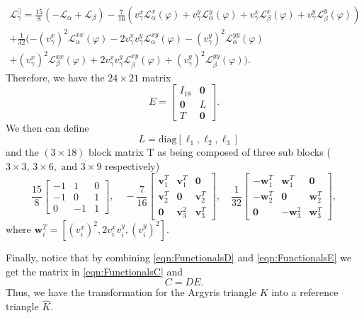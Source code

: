 \begin{equation*}
  \begin{split}
    \mathcal{L}^{||}_{\gamma} = \frac{15}{8}(-\mathcal{L}_{\alpha} +
      \mathcal{L}_{\beta})
    - \frac{7}{16} ( v^x_{\gamma}\mathcal{L}^x_{\alpha}(\varphi) +
      v^y_{\gamma}\mathcal{L}^y_{\alpha}(\varphi) +
      v^x_{\gamma}\mathcal{L}^x_{\beta}(\varphi) +
      v^y_{\gamma}\mathcal{L}^y_{\beta}(\varphi))
      \\
    + \frac{1}{32}(-(v^x_{\gamma})^2\mathcal{L}^{xx}_{\alpha}(\varphi) -
      2 v^x_{\gamma}v^y_{\gamma}\mathcal{L}^{xy}_{\alpha}(\varphi) -
      (v^y_{\gamma})^2\mathcal{L}^{yy}_{\alpha}(\varphi) \\
      + (v^x_{\gamma})^2\mathcal{L}^{xx}_{\beta}(\varphi) +
      2 v^x_{\gamma}v^y_{\gamma}\mathcal{L}^{xy}_{\beta}(\varphi) +
      (v^y_{\gamma})^2\mathcal{L}^{yy}_{\beta}(\varphi)).
  \end{split}
\end{equation*}
Therefore, we have the $24\times 21$ matrix
\begin{equation*}
  E = \begin{bmatrix} I_{18} & \mathbf{0} \\
    \mathbf{0} & L \\
    T & \mathbf{0}
  \end{bmatrix}.
\end{equation*}
We then can define
\begin{equation*}
  \quad L = \text{diag}[\ell_1,\ell_2,\ell_3]
\end{equation*}
and the $(3\times 18)$ block matrix T as being composed of three sub blocks
($3\times 3,\, 3\times 6,\text{ and } 3\times 9$ respectively)
\begin{equation*}
  \frac{15}{8} \begin{bmatrix} -1 & 1 & 0\\ -1 & 0 & 1\\ 0 & -1 & 1\end{bmatrix}, \quad
  -\frac{7}{16} \begin{bmatrix} \mathbf{v}_1^T & \mathbf{v}_1^T & \mathbf{0}\\
    \mathbf{v}_2^T & \mathbf{0} & \mathbf{v}_2^T\\ \mathbf{0} & \mathbf{v}_3^2 & \mathbf{v}_3^T\end{bmatrix}, \quad
  \frac{1}{32} \begin{bmatrix} -\mathbf{w}_1^T & \mathbf{w}_1^T & \mathbf{0}\\
    -\mathbf{w}_2^T & \mathbf{0} & \mathbf{w}_2^T\\ \mathbf{0} & -\mathbf{w}_3^2 & \mathbf{w}_3^T\end{bmatrix},
\end{equation*}
where $\mathbf{w}_i^T = \left[ (v^x_i)^2, 2v^x_i v^y_i, (v^y_i)^2\right]$.

Finally, notice that by combining \eqref{eqn:FunctionalsD} and \eqref{eqn:FunctionalsE}
we get the matrix in \eqref{eqn:FunctionalsC} and
\begin{equation}
  C=DE.
  \label{eqn:Transformation}
\end{equation}
Thus, we have the transformation for the Argyris triangle $K$ into a reference
triangle $\hat{K}$.


